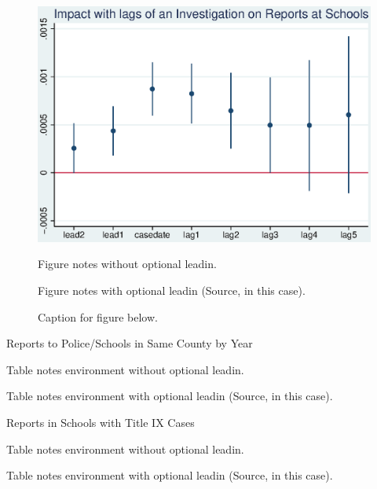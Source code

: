 \documentclass[AER]{AEA}
\begin{document}
\begin{figure}
\includegraphics[width=4.9in]{figures/cases_schools_reports_lags.eps}

\caption{Caption for figure below.}
\begin{figurenotes}
Figure notes without optional leadin.
\end{figurenotes}
\begin{figurenotes}[Source]
Figure notes with optional leadin (Source, in this case).
\end{figurenotes}
\end{figure}



\begin{table}
\caption{Reports to Police/Schools in Same County by Year}



\begin{tablenotes}
Table notes environment without optional leadin.
\end{tablenotes}
\begin{tablenotes}[Source]
Table notes environment with optional leadin (Source, in this case).
\end{tablenotes}
\end{table}

\begin{table}
\caption{Reports in Schools with Title IX Cases}



\begin{tablenotes}
Table notes environment without optional leadin.
\end{tablenotes}
\begin{tablenotes}[Source]
Table notes environment with optional leadin (Source, in this case).
\end{tablenotes}
\end{table}
\end{document}
